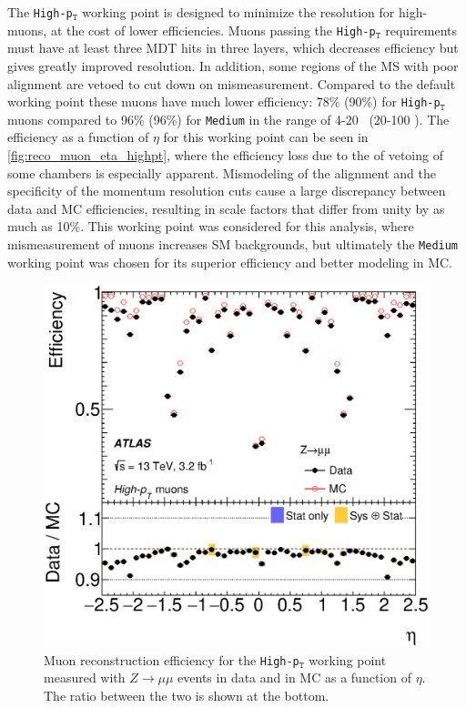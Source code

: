 The \texttt{High-p$_\texttt{T}$} working point is designed to minimize the resolution for high-\pt muons, at the cost of lower efficiencies. Muons passing the \texttt{High-p$_\texttt{T}$} requirements must have at least three \ac{MDT} hits in three layers, which decreases efficiency but gives greatly improved \pt resolution. In addition, some regions of the \ac{MS} with poor alignment are vetoed to cut down on mismeasurement. Compared to the default working point these muons have much lower efficiency: 78\% (90\%) for \texttt{High-p$_\texttt{T}$} muons compared to 96\% (96\%) for \texttt{Medium} in the \pt range of 4-20 \gev~(20-100 \gev). The efficiency as a function of $\eta$ for this working point can be seen in \autoref{fig:reco_muon_eta_highpt}, where the efficiency loss due to the of vetoing of some chambers is especially apparent. Mismodeling of the alignment and the specificity of the momentum resolution cuts cause a large discrepancy between data and \ac{MC} efficiencies, resulting in scale factors that differ from unity by as much as 10\%. This working point was considered for this analysis, where mismeasurement of muons increases \ac{SM} backgrounds, but ultimately the \texttt{Medium} working point was chosen for its superior efficiency and better modeling in \ac{MC}.

\begin{centering}
\begin{figure}[!hbt]
\myfloatalign
\includegraphics[width=.9\linewidth]{figures/reco/fig_03c.eps}
\caption{Muon reconstruction efficiency for the \texttt{High-p$_\texttt{T}$} working point measured with $Z\rightarrow\mu\mu$ events in data and in \ac{MC} as a function of $\eta$. The ratio between the two is shown at the bottom. \cite{1603.05598} }
\label{fig:reco_muon_eta_highpt}
\end{figure}
\end{centering}

